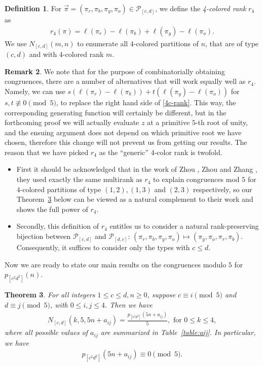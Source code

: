 \documentclass[12pt]{amsart}
\numberwithin{equation}{section}
\theoremstyle{plain}
\newtheorem{theorem}{Theorem}[section]
\theoremstyle{definition}
\newtheorem{Def}[theorem]{Definition}
\newtheorem{remark}[theorem]{Remark}
\begin{document}
\begin{Def}
For $\overrightarrow{\pi}=(\pi_r,\pi_b,\pi_y,\pi_o)\in\mathcal{P}_{[c,d]}$, we define the \emph{4-colored rank} $r_4$ as
\begin{align}\label{4c-rank}
r_4(\pi)=\ell(\pi_{r})-\ell(\pi_{b})+\ell(\pi_{y})-\ell(\pi_{o}).
\end{align}
We use $N_{[c,d]}(m,n)$ to enumerate all $4$-colored partitions of $n$, that are of type $(c,d)$ and with $4$-colored rank $m$.
\end{Def}
\begin{remark}
We note that for the purpose of combinatorially obtaining congruences, there are a number of alternatives that will work equally well as $r_4$. Namely, we can use $s\left(\ell(\pi_{r})-\ell(\pi_{b})\right)+t\left(\ell(\pi_{y})-\ell(\pi_{o})\right)$ for $s,t\not\equiv 0 \pmod 5$, to replace the right hand side of \eqref{4c-rank}. This way, the corresponding generating function will certainly be different, but in the forthcoming proof we will actually evaluate $z$ at a primitive $5$-th root of unity, and the ensuing argument does not depend on which primitive root we have chosen, therefore this change will not prevent us from getting our results. The reason that we have picked $r_4$ as the ``generic'' $4$-color rank is twofold.
\begin{itemize}
\item First it should be acknowledged that in the work of Zhou \cite{Zhou}, Zhou and Zhang \cite{ZZ}, they used exactly the same multirank as $r_4$ to explain congruences mod $5$ for $4$-colored partitions of type $(1,2),(1,3)$ and $(2,3)$ respectively, so our Theorem~\ref{thm:4c} below can be viewed as a natural complement to their work and shows the full power of $r_4$.
\item Secondly, this definition of $r_4$ entitles us to consider a natural rank-preserving bijection between $\mathcal{P}_{[c,d]}$ and $\mathcal{P}_{[d,c]}$: $(\pi_r,\pi_b,\pi_y,\pi_o)\mapsto (\pi_y,\pi_o,\pi_r,\pi_b)$. Consequently, it suffices to consider only the types with $c\leq d$.
\end{itemize}
\end{remark}
Now we are ready to state our main results on the congruences modulo $5$ for $p_{[c^2d^2]}(n)$.
\begin{theorem}\label{thm:4c}
For all integers $1\leq c \leq d, n\geq 0$, suppose $c\equiv i \pmod 5$ and $d\equiv j \pmod 5$, with $0\leq i,j\leq 4$. Then we have
\begin{align}\label{rank:4c}
N_{[c,d]}(k,5,5n+a_{ij})=\frac{p_{[c^2d^2]}(5n+a_{ij})}{5}, \text{ for } 0\leq k \leq 4,
\end{align}
where all possible values of $a_{ij}$ are summarized in Table~\ref{table:aij}. In particular, we have
\begin{align}\label{cong:4c}
p_{[c^2d^2]}(5n+a_{ij})\equiv 0 \pmod 5.
\end{align}
\end{theorem}
\end{document}

